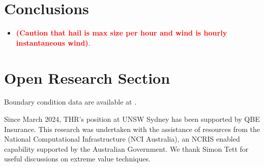 \documentclass[]{agujournal2019}\usepackage[]{graphicx}\usepackage[]{xcolor}
\newcommand*{\todo}[1]{\textbf{\textcolor{red}{(#1)}}}
\begin{document}
\section{Conclusions}

\begin{itemize}
      \item \todo{Caution that hail is max size per hour and wind is hourly instantaneous wind}.
\end{itemize}

\section*{Open Research Section}

Boundary condition data are available at .


\acknowledgments

Since March 2024, THR's position at UNSW Sydney has been supported by QBE Insurance. This research was undertaken with the assistance of resources from the National Computational Infrastructure (NCI Australia), an NCRIS enabled capability supported by the Australian Government. We thank Simon Tett for useful discussions on extreme value techniques.

\nocite{Milbrandt_JAS_2021}
 \nocite{Zhang_JC_2017}
 \nocite{Iacono_JGRA_2008}
 \nocite{Hong_MWR_2006}
 \nocite{Jimenez_MWR_2012}
 \nocite{Niu_JGRA_2011}



\end{document}
